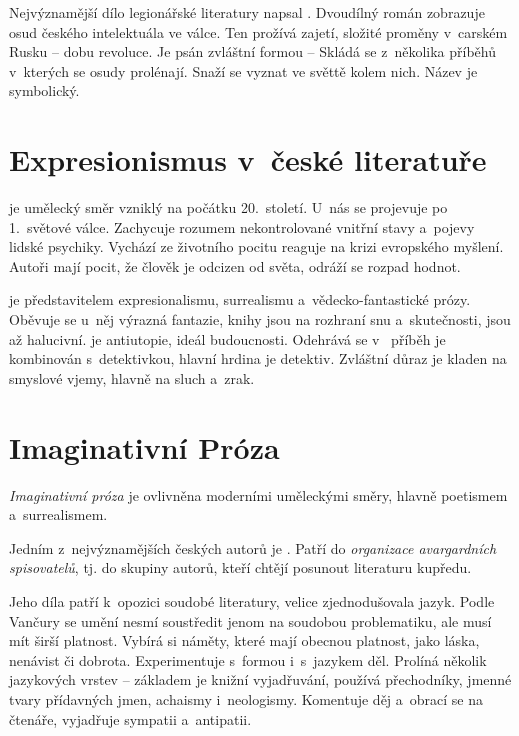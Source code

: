 \delic

Nejvýznamější dílo legionářské literatury napsal . Dvoudílný román  zobrazuje osud českého
intelektuála ve válce. Ten prožívá zajetí, složité proměny v~carském
Rusku -- dobu revoluce. Je psán zvláštní formou --  Skládá se
z~několika příběhů v~kterých se osudy prolénají. Snaží se vyznat ve světtě
kolem nich. Název je symbolický.


\section{Expresionismus v~české literatuře}
 je umělecký směr vzniklý na počátku 20.~století.
U~nás se projevuje po 1.~světové válce. Zachycuje rozumem nekontrolované
vnitřní stavy a~pojevy lidské psychiky. Vychází ze životního pocitu
reaguje na krizi evropského myšlení. Autoři mají pocit, že člověk je
odcizen od světa, odráží se rozpad hodnot.


 je představitelem expresionalismu, surrealismu
a~vědecko-fantastické prózy. Oběvuje se u~něj výrazná fantazie, knihy jsou
na rozhraní snu a~skutečnosti, jsou až halucivní.   je antiutopie, ideál budoucnosti. Odehrává se v~ příběh je kombinován s~detektivkou, hlavní hrdina je
detektiv. Zvláštní důraz je kladen na smyslové vjemy, hlavně na sluch
a~zrak.

\section{Imaginativní Próza}
\emph{Imaginativní próza} je ovlivněna moderními uměleckými směry,
hlavně poetismem a~surrealismem.

Jedním z~nejvýznamějších českých autorů je .
Patří do \emph{organizace avargardních spisovatelů}, tj. do skupiny
autorů, kteří chtějí posunout literaturu kupředu.

Jeho díla patří k~opozici soudobé literatury, velice zjednodušovala
jazyk. Podle Vančury se umění nesmí soustředit jenom na soudobou
problematiku, ale musí mít širší platnost. Vybírá si náměty, které mají
obecnou platnost, jako láska, nenávist či dobrota. Experimentuje
s~formou i~s~jazykem děl. Prolíná několik jazykových vrstev -- základem je
knižní vyjadřuvání, používá přechodníky, jmenné tvary přídavných jmen,
achaismy i~neologismy. Komentuje děj a~obrací se na čtenáře, vyjadřuje
sympatii a~antipatii.

